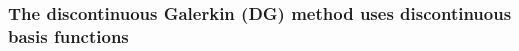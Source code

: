 \begin{frame}
  \frametitle{The discontinuous Galerkin (DG) method uses
  discontinuous basis functions}
  \begin{columns}
    \begin{column}{0.3\textwidth}
\end{column}
\end{columns}
\end{frame}
